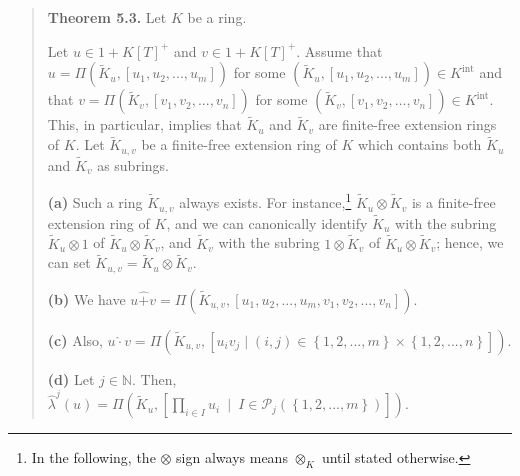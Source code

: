 \documentclass[numbers=enddot,12pt,final,onecolumn,notitlepage]{scrartcl}%
\begin{document}
\begin{quote}
\textbf{Theorem 5.3.} Let $K$ be a ring.

Let $u\in1+K\left[  T\right]  ^{+}$ and $v\in1+K\left[  T\right]  ^{+}$.
Assume that $u=\Pi\left(  \widetilde{K}_{u},\left[  u_{1},u_{2},...,u_{m}%
\right]  \right)  $ for some $\left(  \widetilde{K}_{u},\left[  u_{1}%
,u_{2},...,u_{m}\right]  \right)  \in K^{\operatorname*{int}}$ and that
$v=\Pi\left(  \widetilde{K}_{v},\left[  v_{1},v_{2},...,v_{n}\right]  \right)
$ for some $\left(  \widetilde{K}_{v},\left[  v_{1},v_{2},...,v_{n}\right]
\right)  \in K^{\operatorname*{int}}$. This, in particular, implies that
$\widetilde{K}_{u}$ and $\widetilde{K}_{v}$ are finite-free extension rings of
$K$. Let $\widetilde{K}_{u,v}$ be a finite-free extension ring of $K$ which
contains both $\widetilde{K}_{u}$ and $\widetilde{K}_{v}$ as subrings.

\textbf{(a)} Such a ring $\widetilde{K}_{u,v}$ always exists. For
instance,\footnote{In the following, the $\otimes$ sign always means
$\otimes_{K}$ until stated otherwise.} $\widetilde{K}_{u}\otimes
\widetilde{K}_{v}$ is a finite-free extension ring of $K$, and we can
canonically identify $\widetilde{K}_{u}$ with the subring $\widetilde{K}%
_{u}\otimes1$ of $\widetilde{K}_{u}\otimes\widetilde{K}_{v}$, and
$\widetilde{K}_{v}$ with the subring $1\otimes\widetilde{K}_{v}$ of
$\widetilde{K}_{u}\otimes\widetilde{K}_{v}$; hence, we can set $\widetilde{K}%
_{u,v}=\widetilde{K}_{u}\otimes\widetilde{K}_{v}$.

\textbf{(b)} We have $u\widehat{+}v=\Pi\left(  \widetilde{K}_{u,v},\left[
u_{1},u_{2},...,u_{m},v_{1},v_{2},...,v_{n}\right]  \right)  $.

\textbf{(c)} Also, $u\widehat{\cdot}v=\Pi\left(  \widetilde{K}_{u,v},\left[
u_{i}v_{j}\mid\left(  i,j\right)  \in\left\{  1,2,...,m\right\}
\times\left\{  1,2,...,n\right\}  \right]  \right)  $.

\textbf{(d)} Let $j\in\mathbb{N}$. Then, $\widehat{\lambda}^{j}\left(
u\right)  =\Pi\left(  \widetilde{K}_{u},\left[  \prod\limits_{i\in I}%
u_{i}\ \mid\ I\in\mathcal{P}_{j}\left(  \left\{  1,2,...,m\right\}  \right)
\right]  \right)  $.
\end{quote}
\end{document}
